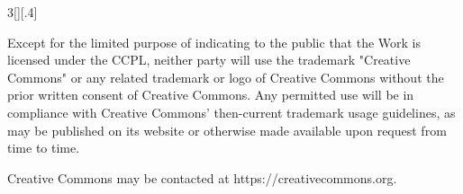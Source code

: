 \documentclass[8pt,a4paper]{article}
\begin{document}
\begin{multicols}{3}[][.4\paperwidth]
\smallskip

Except for the limited purpose of indicating to the public that the Work is
licensed under the CCPL, neither party will use the trademark "Creative
Commons" or any related trademark or logo of Creative Commons without the prior
written consent of Creative Commons. Any permitted use will be in compliance
with Creative Commons' then-current trademark usage guidelines, as may be
published on its website or otherwise made available upon request from time to
time.

\smallskip

Creative Commons may be contacted at https://creativecommons.org.

\end{multicols}
\end{document}
